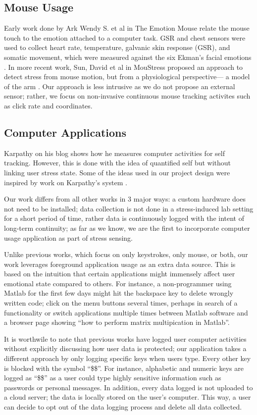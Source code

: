 \documentclass{article}
\begin{document}
\subsection{Mouse Usage}
Early work done by Ark Wendy S. et al in The Emotion Mouse relate the mouse touch to the emotion attached to a computer task. GSR and chest sensors were used to collect heart rate, temperature, galvanic skin response (GSR), and somatic movement, which were measured against the six Ekman’s facial emotions \cite{ark1999emotion}. In more recent work, Sun, David et al in MouStress proposed an approach to detect stress from mouse motion, but from a physiological perspective--- a model of the arm \cite{sun2014moustress}. Our approach is less intrusive as we do not propose an external sensor; rather, we focus on  non-invasive continuous mouse tracking activites such as click rate and coordinates.

\subsection{Computer Applications}
Karpathy on his blog shows how he measures computer activities for self tracking. However, this is done with the idea of quantified self but without linking user stress state. Some of the ideas used in our project design were inspired by work on Karpathy's system \cite{karpathy}.

Our work differs from all other works in 3 major ways: a custom hardware does not need to be installed; data collection is not done in a stress-induced lab setting for a short period of time, rather data is continuously logged with the intent of long-term continuity; as far as we know, we are the first to incorporate computer usage application as part of stress sensing. 

Unlike previous works, which focus on only keystrokes, only mouse, or both, our work leverages foreground application usage as an extra data source. This is based on the intuition that certain applications might immensely affect user emotional state compared to others. For instance, a non-programmer using Matlab for the first few days might hit the backspace key to delete wrongly written code; click on the menu buttons several times, perhaps in search of a functionality or switch applications multiple times between Matlab software and a browser page showing ``how to perform matrix multipication in Matlab''.

It is worthwile to note that previous works have logged user computer activities without explicitly discussing how user data is protected; our application takes a different approach by only logging specific keys when users type. Every other key is blocked with the symbol ``\$\$''. For instance, alphabetic and numeric keys are logged as ``\$\$'' as a user could type highly sensitive information such as passwords or personal messages. In addition, every data logged is not uploaded to a cloud server; the data is locally stored on the user's computer. This way, a user can decide to opt out of the data logging process and delete all data collected.
\end{document}
